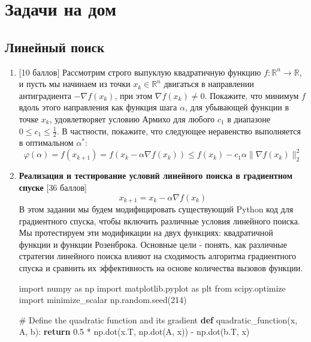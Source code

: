 \documentclass[
  russian,
  letterpaper,
  DIV=11,
  numbers=noendperiod]{scrartcl}
\newenvironment{Shaded}{\begin{snugshade}}{\end{snugshade}}
\newcommand{\CommentTok}[1]{\textcolor[rgb]{0.37,0.37,0.37}{#1}}
\newcommand{\ControlFlowTok}[1]{\textcolor[rgb]{0.00,0.23,0.31}{\textbf{#1}}}
\newcommand{\DecValTok}[1]{\textcolor[rgb]{0.68,0.00,0.00}{#1}}
\newcommand{\FloatTok}[1]{\textcolor[rgb]{0.68,0.00,0.00}{#1}}
\newcommand{\ImportTok}[1]{\textcolor[rgb]{0.00,0.46,0.62}{#1}}
\newcommand{\KeywordTok}[1]{\textcolor[rgb]{0.00,0.23,0.31}{\textbf{#1}}}
\newcommand{\NormalTok}[1]{\textcolor[rgb]{0.00,0.23,0.31}{#1}}
\newcommand{\OperatorTok}[1]{\textcolor[rgb]{0.37,0.37,0.37}{#1}}
\begin{document}
\section{Задачи на
дом}\label{ux437ux430ux434ux430ux447ux438-ux43dux430-ux434ux43eux43c}

\subsection{Линейный
поиск}\label{ux43bux438ux43dux435ux439ux43dux44bux439-ux43fux43eux438ux441ux43a-1}

\begin{enumerate}
\def\labelenumi{\arabic{enumi}.}
\item
  {[}10 баллов{]} Рассмотрим строго выпуклую квадратичную функцию
  \(f: \mathbb{R}^n \rightarrow \mathbb{R}\), и пусть мы начинаем из
  точки \(x_k \in \mathbb{R}^n\) двигаться в направлении антиградиента
  \(-\nabla f(x_k)\), при этом \(\nabla f(x_k)\neq 0\). Покажите, что
  минимум \(f\) вдоль этого направления как функция шага \(\alpha\), для
  убывающей функции в точке \(x_k\), удовлетворяет условию Армихо для
  любого \(c_1\) в диапазоне \(0 \leq c_1 \leq \frac{1}{2}\). В
  частности, покажите, что следующее неравенство выполняется в
  оптимальном \(\alpha^*\): \[
   \varphi(\alpha) = f(x_{k+1}) = f(x_k - \alpha \nabla f(x_k)) \leq f(x_k) - c_1 \alpha \|\nabla f(x_k)\|_2^2
   \]
\item
  \textbf{Реализация и тестирование условий линейного поиска в
  градиентном спуске} {[}36 баллов{]} \[
   x_{k+1} = x_k - \alpha \nabla f(x_k)
   \] В этом задании мы будем модифицировать существующий Python код для
  градиентного спуска, чтобы включить различные условия линейного
  поиска. Мы протестируем эти модификации на двух функциях: квадратичной
  функции и функции Розенброка. Основные цели - понять, как различные
  стратегии линейного поиска влияют на сходимость алгоритма градиентного
  спуска и сравнить их эффективность на основе количества вызовов
  функции.

\begin{Shaded}
\begin{Highlighting}[]
\ImportTok{import}\NormalTok{ numpy }\ImportTok{as}\NormalTok{ np}
\ImportTok{import}\NormalTok{ matplotlib.pyplot }\ImportTok{as}\NormalTok{ plt}
\ImportTok{from}\NormalTok{ scipy.optimize }\ImportTok{import}\NormalTok{ minimize\_scalar}
\NormalTok{np.random.seed(}\DecValTok{214}\NormalTok{)}

\CommentTok{\# Define the quadratic function and its gradient}
\KeywordTok{def}\NormalTok{ quadratic\_function(x, A, b):}
    \ControlFlowTok{return} \FloatTok{0.5} \OperatorTok{*}\NormalTok{ np.dot(x.T, np.dot(A, x)) }\OperatorTok{{-}}\NormalTok{ np.dot(b.T, x)}


\end{Highlighting}
\end{Shaded}
\end{enumerate}
\end{document}

